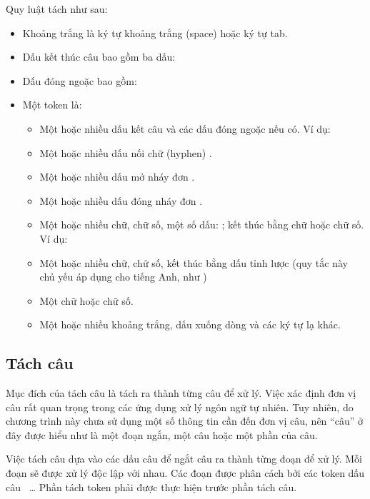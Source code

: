 \documentclass[a4paper,oneside,14pt]{extbook} %
\begin{document}
Quy luật tách như sau:
\begin{itemize}
\item Khoảng trắng là ký tự khoảng trắng (space) hoặc ký tự tab.
\item Dấu kết thúc câu bao gồm ba dấu:   \mybox{!}
\item Dấu đóng ngoặc bao gồm:  \mybox{)} \mybox{]} \mybox{\}}
  \mybox{>} 
\item Một token là:
  \begin{itemize}
  \item Một hoặc nhiều dấu kết câu và các dấu đóng ngoặc nếu có. Ví
    dụ: 
  \item Một hoặc nhiều dấu nối chữ (hyphen) \mybox{-}.
  \item Một hoặc nhiều dấu mở nháy đơn .
  \item Một hoặc nhiều dấu đóng nháy đơn .
  \item Một hoặc nhiều chữ, chữ số, một số dấu:  \mybox{,}
    \mybox{:}  \mybox{\$} \mybox{\%} \mybox{-}
    \mybox{$\backslash$} \mybox{/}; kết thúc bằng chữ hoặc chữ số. Ví
    dụ:  
  \item Một hoặc nhiều chữ, chữ số, kết thúc bằng dấu tỉnh lược
     (quy tắc này chủ yếu áp dụng cho tiếng Anh, như
      \mybox{ }  \mybox{ } )
  \item Một chữ hoặc chữ số.
  \item Một hoặc nhiều khoảng trắng,  dấu xuống dòng và các ký tự lạ khác.
  \end{itemize}
\end{itemize}

\subsection{Tách câu}
\label{sec:model:sentence-segmentation}

Mục đích của tách câu là tách ra thành từng câu để xử lý. Việc xác
định đơn vị câu rất quan trọng trong các ứng dụng xử lý ngôn ngữ tự
nhiên. Tuy nhiên, do chương trình này chưa sử dụng một số thông tin
cần đến đơn vị câu, nên ``câu'' ở đây được hiểu như là một đoạn ngắn,
một câu hoặc một phần của câu. 

Việc tách câu dựa vào các dấu câu để ngắt câu ra thành từng đoạn để xử
lý. Mỗi đoạn sẽ được xử lý độc lập với nhau. Các đoạn được phân cách
bởi các token dấu câu  \mybox{,} \mybox{;} \mybox{(}
\mybox{)}~\ldots{} Phần tách token phải được thực hiện trước phần tách
câu. 
\end{document}
